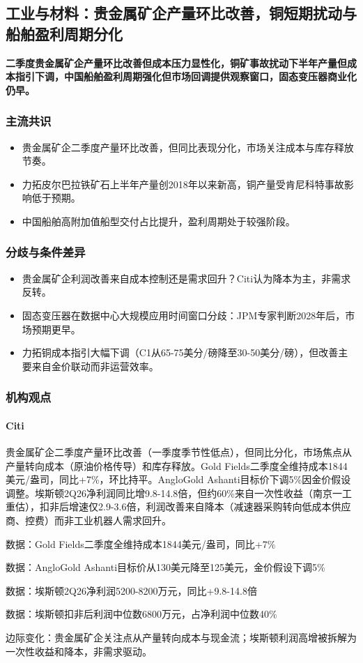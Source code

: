 \documentclass[11pt]{ctexart}
\begin{document}
\subsection{工业与材料：贵金属矿企产量环比改善，铜短期扰动与船舶盈利周期分化}
\textbf{二季度贵金属矿企产量环比改善但成本压力显性化，铜矿事故扰动下半年产量但成本指引下调，中国船舶盈利周期强化但市场回调提供观察窗口，固态变压器商业化仍早。}
\subsubsection*{主流共识}
\begin{itemize}
  \item 贵金属矿企二季度产量环比改善，但同比表现分化，市场关注成本与库存释放节奏。
  \item 力拓皮尔巴拉铁矿石上半年产量创2018年以来新高，铜产量受肯尼科特事故影响低于预期。
  \item 中国船舶高附加值船型交付占比提升，盈利周期处于较强阶段。
\end{itemize}
\subsubsection*{分歧与条件差异}
\begin{itemize}
  \item 贵金属矿企利润改善来自成本控制还是需求回升？Citi认为降本为主，非需求反转。
  \item 固态变压器在数据中心大规模应用时间窗口分歧：JPM专家判断2028年后，市场预期更早。
  \item 力拓铜成本指引大幅下调（C1从65-75美分/磅降至30-50美分/磅），但改善主要来自金价联动而非运营效率。
\end{itemize}
\subsubsection*{机构观点}
\paragraph{Citi} 贵金属矿企二季度产量环比改善（一季度季节性低点），但同比分化，市场焦点从产量转向成本（原油价格传导）和库存释放。Gold Fields二季度全维持成本1844美元/盎司，同比+7\%，环比持平。AngloGold Ashanti目标价下调5\%因金价假设调整。埃斯顿2Q26净利润同比增9.8-14.8倍，但约60\%来自一次性收益（南京一工重估），扣非后增速仅2.9-3.6倍，利润改善来自降本（减速器采购转向低成本供应商、控费）而非工业机器人需求回升。
{\small\color{refgray}数据：Gold Fields二季度全维持成本1844美元/盎司，同比+7\%\par}
{\small\color{refgray}数据：AngloGold Ashanti目标价从130美元降至125美元，金价假设下调5\%\par}
{\small\color{refgray}数据：埃斯顿2Q26净利润5200-8200万元，同比+9.8-14.8倍\par}
{\small\color{refgray}数据：埃斯顿扣非后利润中位数6800万元，占净利润中位数40\%\par}
{\small\color{refgray}边际变化：贵金属矿企关注点从产量转向成本与现金流；埃斯顿利润高增被拆解为一次性收益和降本，非需求驱动。\par}
\end{document}

